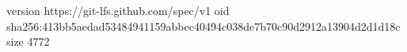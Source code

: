 version https://git-lfs.github.com/spec/v1
oid sha256:413bb5aedad53484941159abbec40494c038de7b70c90d2912a13904d2d1d18c
size 4772
